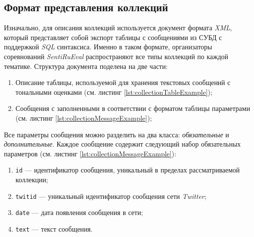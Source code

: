 \subsection{Формат представления коллекций}
    \label{sec:programmingInnerFormat}

    Изначально, для описания коллекций используется документ формата {\it XML},
    который представляет собой экспорт таблицы с сообщениями из СУБД с поддержкой
    {\it SQL} синтаксиса.
    Именно в таком формате, организаторы соревнований {\it SentiRuEval}
    распространяют все типы коллекций по каждой тематике. Структура документа
    поделена на две части:
    \begin{enumerate}
        \item Описание таблицы, используемой для хранения текстовых сообщений с
            тональными оценками (см. листинг \ref{lst:collectionTableExample});
        \item Сообщения с заполненными в соответствии с форматом таблицы
            параметрами (см. листинг \ref{lst:collectionMessageExample});
    \end{enumerate}

    \newpage
    \lstset{style=xml}
    \newpage
    

    \lstset{style=xml}
    

    Все параметры сообщения можно разделить на два класса: {\it обязательные} и
    {\it дополнительные}. Каждое сообщение содержит следующий набор
    обязательных параметров (см. листинг \ref{lst:collectionMessageExample}):
    \begin{enumerate}
        \item {\tt id} --- идентификатор сообщения, уникальный в пределах рассматриваемой коллекции;
        \item {\tt twitid} --- уникальный идентификатор сообщения сети {\it Twitter};
        \item {\tt date} --- дата появления сообщения в сети;
        \item {\tt text} --- текст сообщения.
    \end{enumerate}

